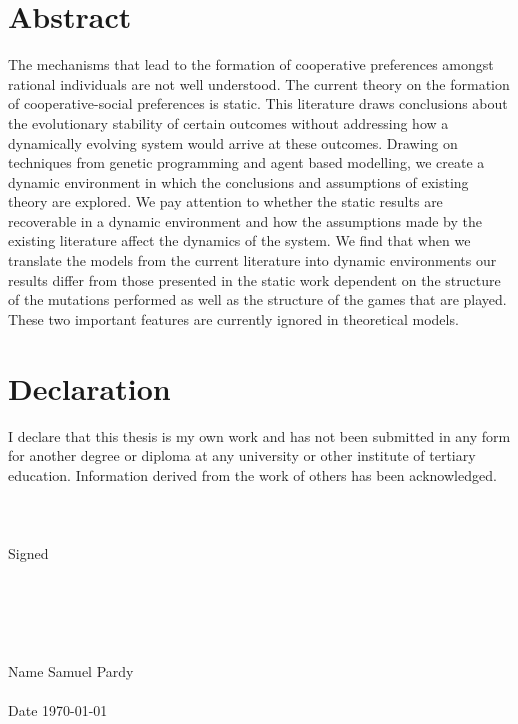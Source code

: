 \documentclass[11pt]{book}
\newcommand*{\np}{\par\noindent\newline}
\newcommand*{\authorimg}[1]{%
  \raisebox{-.3\baselineskip}{%
    \texttt{[image: \#1]}%
  }%
}
\begin{document}
\chapter*{Abstract}
{ The mechanisms that lead to the formation of cooperative preferences amongst rational individuals are not well understood. 
The current theory on the formation of cooperative-social preferences is static. 
This literature draws conclusions about the evolutionary stability of certain outcomes without addressing how a dynamically evolving system would arrive at these outcomes. 
Drawing on techniques from genetic programming and agent based modelling, we create a dynamic environment in which the conclusions and assumptions of existing theory are explored.
We pay attention to whether the static results are recoverable in a dynamic environment and how the assumptions made by the existing literature affect the dynamics of the system. 
We find that when we translate the models from the current literature into dynamic environments our results differ from those presented in the static work dependent on the structure of the mutations performed as well as the structure of the games that are played.
These two important features are currently ignored in theoretical models.
\par}

\chapter*{Declaration}
\np I declare that this thesis is my own work and has not been submitted in any form for another degree or diploma at any university or other institute of tertiary education. Information derived from the work of others has been acknowledged.\\\\\\\\




\noindent Signed\\\\\\
\newline   \-\  \qquad\qquad\authorimg{resources/signature.PNG}\\\\\\





\noindent Name \quad	Samuel Pardy\\\\
\noindent Date \quad \today
\end{document}
